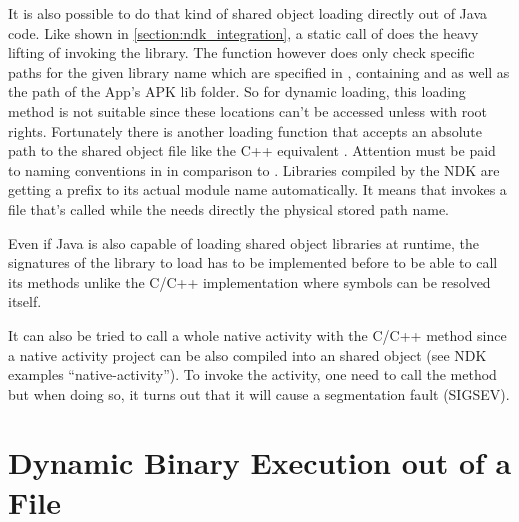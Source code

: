 It is also possible to do that kind of shared object loading directly out of Java
code. Like shown in \autoref{section:ndk_integration}, a static call of
 does the heavy lifting of invoking the library.
The  function however does only check specific paths for the given
library name which are specified in , containing
 and  as well as the path of the App's APK lib
folder. So for dynamic loading, this loading method is not suitable since these
locations can't be accessed unless with root rights. Fortunately there is another
loading function  that accepts an absolute path to
the shared object file like the C++ equivalent . Attention must be
paid to naming conventions in  in comparison to .
Libraries compiled by the NDK are getting a  prefix to its actual module
name automatically. It means that  invokes a file
that's called  while the  needs directly the physical
stored path name.

Even if Java is also capable of loading shared object libraries at runtime, the
signatures of the library to load has to be implemented before to be able to call
its methods unlike the C/C++ implementation where symbols can be resolved itself.

It can also be tried to call a whole native activity with the C/C++ method since
a native activity project can be also compiled into an shared object (see NDK
examples ``native-activity''). To invoke the activity, one need to call the
 method but when doing so, it turns out that it will cause
a segmentation fault (SIGSEV).


\section{Dynamic Binary Execution out of a File}\label{section:dyn_bin_exec}

